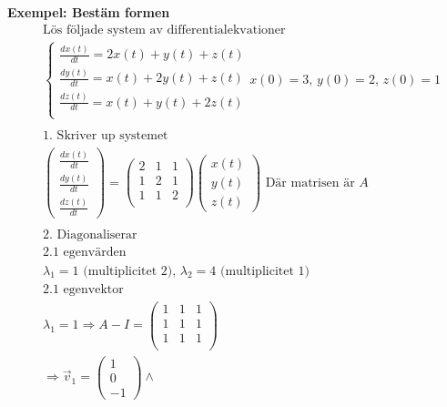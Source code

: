 \begin{multicols}{2}
\textbf{Exempel: Bestäm formen}
\begin{align*}
  &\text{Lös följade system av differentialekvationer} \\
  &\left\{\begin{array}{rrr}
  \frac{dx(t)}{dt} = 2x(t) + y(t) + z(t) \\
  \frac{dy(t)}{dt} =  x(t) +2y(t) + z(t) \\
  \frac{dz(t)}{dt} =  x(t) + y(t) +2z(t) \\
  \end{array}\right. x (0) =3, \, y (0) =2, \, z (0) =1  \\
  &\\
  &\text{1. Skriver up systemet} \\
  &
  \begin{pmatrix} \frac{dx (t)}{dt} \\ \frac{dy (t)}{dt} \\ \frac{dz (t)}{dt} \end{pmatrix} =
  \left(\begin{array}{ccc}
    2 & 1 & 1 \\
    1 & 2 & 1 \\
    1 & 1 & 2 \\
  \end{array}\right)
  \begin{pmatrix} x (t) \\ y (t) \\ z (t)  \end{pmatrix}  \text{ Där matrisen är $A$} \\
  &\\
  &\text{2. Diagonaliserar} \\
  &\text{2.1 egenvärden} \\
  &\lambda_1 = 1 \text{ (multiplicitet 2), } \lambda_2 = 4 \text{ (multiplicitet 1) } \\
  &\text{2.1 egenvektor} \\
  &\lambda_1 = 1 \Rightarrow{}  A -I =
  \left(\begin{array}{ccc}
    1 & 1 & 1 \\
    1 & 1 & 1 \\
    1 & 1 & 1 \\
  \end{array}\right)  \\
  &\Rightarrow{}
  \vec{v}_1 = \begin{pmatrix} 1 \\ 0 \\ -1  \end{pmatrix} \land{}

\end{align*}
\end{multicols}
